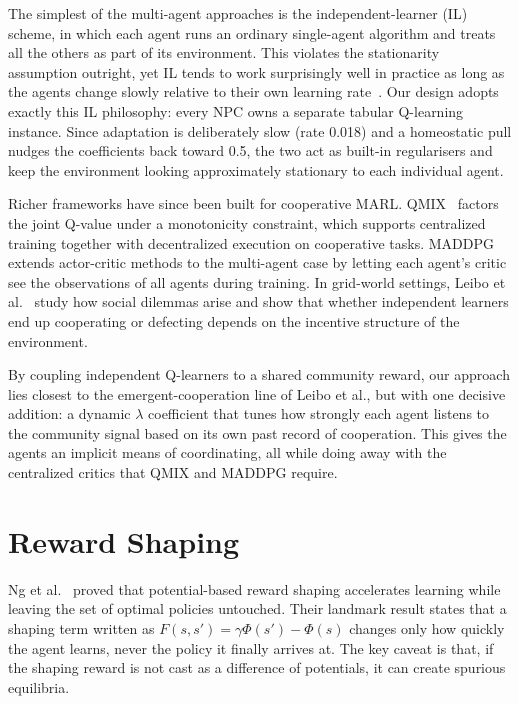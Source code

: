 \documentclass[12pt, a4paper, oneside]{report}
\begin{document}
The simplest of the multi-agent approaches is the independent-learner (IL) scheme, in which each agent runs an ordinary single-agent algorithm and treats all the others as part of its environment. This violates the stationarity assumption outright, yet IL tends to work surprisingly well in practice as long as the agents change slowly relative to their own learning rate~\cite{busoniu2008marl}. Our design adopts exactly this IL philosophy: every NPC owns a separate tabular Q-learning instance. Since adaptation is deliberately slow (rate 0.018) and a homeostatic pull nudges the coefficients back toward 0.5, the two act as built-in regularisers and keep the environment looking approximately stationary to each individual agent.

Richer frameworks have since been built for cooperative MARL. QMIX~\cite{rashid2018qmix} factors the joint Q-value under a monotonicity constraint, which supports centralized training together with decentralized execution on cooperative tasks. MADDPG~\cite{lowe2017maddpg} extends actor-critic methods to the multi-agent case by letting each agent's critic see the observations of all agents during training. In grid-world settings, Leibo et al.~\cite{leibo2017multi} study how social dilemmas arise and show that whether independent learners end up cooperating or defecting depends on the incentive structure of the environment.

By coupling independent Q-learners to a shared community reward, our approach lies closest to the emergent-cooperation line of Leibo et al., but with one decisive addition: a dynamic $\lambda$ coefficient that tunes how strongly each agent listens to the community signal based on its own past record of cooperation. This gives the agents an implicit means of coordinating, all while doing away with the centralized critics that QMIX and MADDPG require.

\section{Reward Shaping}
\label{sec:reward-shaping}

Ng et al.~\cite{ng1999rewardshaping} proved that potential-based reward shaping accelerates learning while leaving the set of optimal policies untouched. Their landmark result states that a shaping term written as $F(s, s') = \gamma \Phi(s') - \Phi(s)$ changes only how quickly the agent learns, never the policy it finally arrives at. The key caveat is that, if the shaping reward is not cast as a difference of potentials, it can create spurious equilibria.
\end{document}
